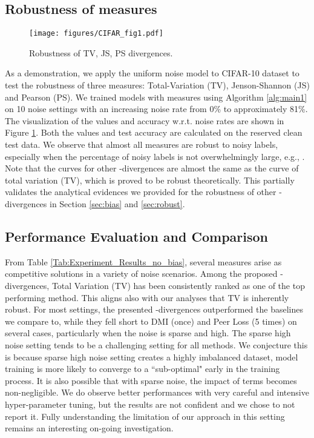 \documentclass{article}
\begin{document}
\subsection{Robustness of  measures}
\begin{figure}[ht]
\vspace{-0.2in}
    \centering
    {\texttt{[image: figures/CIFAR\_fig1.pdf]}
    }
        \vspace{-5pt}
        \caption{Robustness of TV, JS, PS divergences. 
        \vspace{-15pt}
    }
    \label{fig: robust_f_div}
\end{figure}
As a demonstration, we apply the uniform noise model to CIFAR-10 dataset to test the robustness of three  measures: Total-Variation (TV), Jenson-Shannon (JS) and Pearson (PS). We trained models with  measures using Algorithm \ref{alg:main1} on 10 noise settings with an increasing noise rate from 0\% to approximately 81\%. The visualization of the  values and accuracy w.r.t. noise rates are shown in Figure \ref{fig: robust_f_div}. Both the  values and test accuracy are calculated on the reserved clean test data. We observe that almost all  measures are robust to noisy labels, especially when the percentage of noisy labels is not overwhelmingly large, e.g., . Note that the curves for other -divergences are almost the same as the curve of total variation (TV), which is proved to be robust theoretically. This partially validates the analytical evidences we provided for the robustness of other -divergences in Section \ref{sec:bias} and \ref{sec:robust}. 

\subsection{Performance Evaluation and Comparison}

From Table \ref{Tab:Experiment_Results_no_bias}, several  measures arise as competitive solutions in a variety of noise scenarios. Among the proposed -divergences, Total Variation (TV) has been consistently ranked as one of the top performing method. This aligns also with our analyses that TV is inherently robust. For most settings, the presented -divergences outperformed the baselines we compare to, while they fell short to DMI (once) and Peer Loss (5 times) on several cases, particularly when the noise is sparse and high.
The sparse high noise setting tends to be a challenging setting for all methods. We conjecture this is because sparse high noise setting creates a highly imbalanced dataset, model training is more likely to converge to a ``sub-optimal" early in the training process. It is also possible that with sparse noise, the impact of  terms becomes non-negligible.  We do observe better performances with very careful and intensive hyper-parameter tuning, but the results are not confident and we chose to not report it. Fully understanding the limitation of our approach in this setting remains an interesting on-going investigation. 
\end{document}
